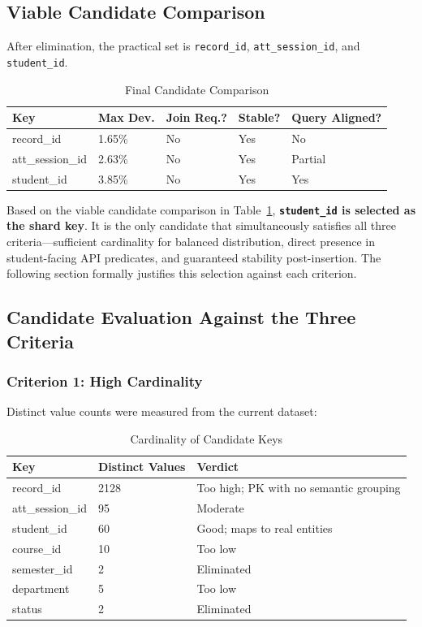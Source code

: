 \documentclass[conference]{IEEEtran}
\begin{document}
\subsection{Viable Candidate Comparison}
After elimination, the practical set is \texttt{record\_id}, \texttt{att\_session\_id}, and \texttt{student\_id}.

\begin{table}[htbp]
\caption{Final Candidate Comparison}
\centering
\begin{tabular}{p{2.55cm}p{1.35cm}p{1.0cm}p{0.95cm}p{1.5cm}}
\toprule
\textbf{Key} & \textbf{Max Dev.} & \textbf{Join Req.?} & \textbf{Stable?} & \textbf{Query Aligned?} \\
\midrule
record\_id & 1.65\% & No & Yes & No \\
att\_session\_id & 2.63\% & No & Yes & Partial \\
student\_id & 3.85\% & No & Yes & Yes \\
\bottomrule
\end{tabular}
\label{tab:viable_candidates}
\end{table}

Based on the viable candidate comparison in Table~\ref{tab:viable_candidates}, \textbf{\texttt{student\_id} is selected as the shard key}. It is the only candidate that simultaneously satisfies all three criteria---sufficient cardinality for balanced distribution, direct presence in student-facing API predicates, and guaranteed stability post-insertion. The following section formally justifies this selection against each criterion.

\subsection{Candidate Evaluation Against the Three Criteria}

\subsubsection{Criterion 1: High Cardinality}
Distinct value counts were measured from the current dataset:

\begin{table}[htbp]
\caption{Cardinality of Candidate Keys}
\centering
\begin{tabular}{p{2.5cm}p{1.8cm}p{2.4cm}}
\toprule
\textbf{Key} & \textbf{Distinct Values} & \textbf{Verdict} \\
\midrule
record\_id & 2128 & Too high; PK with no semantic grouping \\
att\_session\_id & 95 & Moderate \\
student\_id & 60 & Good; maps to real entities \\
course\_id & 10 & Too low \\
semester\_id & 2 & Eliminated \\
department & 5 & Too low \\
status & 2 & Eliminated \\
\bottomrule
\end{tabular}
\label{tab:cardinality}
\end{table}
\end{document}

